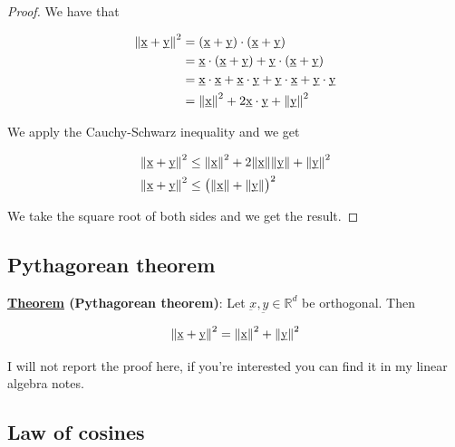 \documentclass[10pt]{extarticle}
\newcommand{\R}{\mathbb{R}}
\begin{document}
\begin{proof}
    We have that

    \begin{align*}
        \norm{\underbar{x} + \underbar{y}}^2 & = (\underbar{x} + \underbar{y}) \cdot (\underbar{x} + \underbar{y})                                                                     \\
                                             & = \underbar{x} \cdot (\underbar{x} + \underbar{y}) + \underbar{y} \cdot (\underbar{x} + \underbar{y})                                   \\
                                             & = \underbar{x} \cdot \underbar{x} + \underbar{x} \cdot \underbar{y} + \underbar{y} \cdot \underbar{x} + \underbar{y} \cdot \underbar{y} \\
                                             & = \norm{\underbar{x}}^2 + 2 \underbar{x} \cdot \underbar{y} + \norm{\underbar{y}}^2
    \end{align*}

    We apply the Cauchy-Schwarz inequality and we get

    \begin{align*}
        \norm{\underbar{x} + \underbar{y}}^2 & \leq \norm{\underbar{x}}^2 + 2 \norm{\underbar{x}} \norm{\underbar{y}} + \norm{\underbar{y}}^2 \\
        \norm{\underbar{x} + \underbar{y}}^2 & \leq \left(\norm{\underbar{x}} + \norm{\underbar{y}}\right)^2
    \end{align*}

    We take the square root of both sides and we get the result.
\end{proof}

\subsection{Pythagorean theorem}

\textbf{\underline{Theorem} (Pythagorean theorem)}: Let $\underbar{x}, \underbar{y} \in \R^d$ be orthogonal. Then

$$
    \norm{\underbar{x} + \underbar{y}}^2 = \norm{\underbar{x}}^2 + \norm{\underbar{y}}^2
$$

I will not report the proof here, if you're interested you can find it in my linear algebra notes.

\subsection{Law of cosines}
\end{document}
